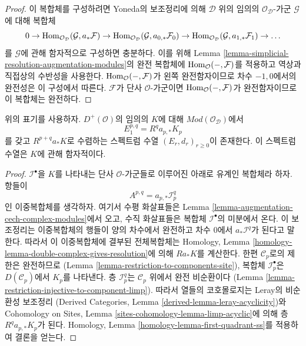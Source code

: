 \begin{proof}
이 복합체를 구성하려면 Yoneda의 보조정리에 의해
$\mathcal{D}$ 위의 임의의 $\mathcal{O}_\mathcal{D}$-가군
$\mathcal{G}$에 대해 복합체
$$
0 \to \mathop{\mathrm{Hom}}\nolimits_{\mathcal{O}_\mathcal{D}}(\mathcal{G}, a_*\mathcal{F}) \to
\mathop{\mathrm{Hom}}\nolimits_{\mathcal{O}_\mathcal{D}}(\mathcal{G}, a_{0, *}\mathcal{F}_0) \to
\mathop{\mathrm{Hom}}\nolimits_{\mathcal{O}_\mathcal{D}}(\mathcal{G}, a_{1, *}\mathcal{F}_1) \to \ldots
$$
를 $\mathcal{G}$에 관해 함자적으로 구성하면 충분하다.
이를 위해 Lemma \ref{lemma-simplicial-resolution-augmentation-modules}의
완전 복합체에 $\mathop{\mathrm{Hom}}\nolimits_\mathcal{O}(-, \mathcal{F})$를 적용하고
역상과 직접상의 수반성을 사용한다.
$\mathop{\mathrm{Hom}}\nolimits_\mathcal{O}(-, \mathcal{F})$가 왼쪽 완전함자이므로
차수 $-1, 0$에서의 완전성은 이 구성에서 따른다.
$\mathcal{F}$가 단사 $\mathcal{O}$-가군이면
$\mathop{\mathrm{Hom}}\nolimits_\mathcal{O}(-, \mathcal{F})$가 완전함자이므로
이 복합체는 완전하다.
\end{proof}

\begin{lemma}
\label{lemma-augmentation-spectral-sequence-modules}
위의 표기를 사용하자. $D^+(\mathcal{O})$의 임의의 $K$에 대해
$\textit{Mod}(\mathcal{O}_\mathcal{D})$에서
$$
E_1^{p, q} = R^qa_{p, *} K_p
$$
를 갖고 $R^{p + q}a_*K$로 수렴하는 스펙트럼 수열
$(E_r, d_r)_{r \geq 0}$이 존재한다.
이 스펙트럼 수열은 $K$에 관해 함자적이다.
\end{lemma}

\begin{proof}
$\mathcal{I}^\bullet$을 $K$를 나타내는 단사 $\mathcal{O}$-가군들로
이루어진 아래로 유계인 복합체라 하자. 항들이
$$
A^{p, q} = a_{p, *}\mathcal{I}^q_p
$$
인 이중복합체를 생각하자. 여기서 수평 화살표들은
Lemma \ref{lemma-augmentation-cech-complex-modules}에서 오고,
수직 화살표들은 복합체 $\mathcal{I}^\bullet$의 미분에서 온다.
이 보조정리는 이중복합체의 행들이 양의 차수에서 완전하고
차수 $0$에서 $a_*\mathcal{I}^q$가 된다고 말한다.
따라서 이 이중복합체에 결부된 전체복합체는
Homology, Lemma \ref{homology-lemma-double-complex-gives-resolution}에 의해
$Ra_*K$를 계산한다. 한편 $\mathcal{C}_p$로의 제한은 완전하므로
(Lemma \ref{lemma-restriction-to-components-site}),
복합체 $\mathcal{I}_p^\bullet$은 $D(\mathcal{C}_p)$에서 $K_p$를 나타낸다.
층 $\mathcal{I}_p^q$는 $\mathcal{C}_p$ 위에서 완전 비순환이다
(Lemma \ref{lemma-restriction-injective-to-component-limp}).
따라서 열들의 코호몰로지는 Leray의 비순환성 보조정리
(Derived Categories, Lemma \ref{derived-lemma-leray-acyclicity})와
Cohomology on Sites, Lemma \ref{sites-cohomology-lemma-limp-acyclic}에 의해
층 $R^qa_{p, *}K_p$가 된다.
Homology, Lemma \ref{homology-lemma-first-quadrant-ss}를 적용하여
결론을 얻는다.
\end{proof}


